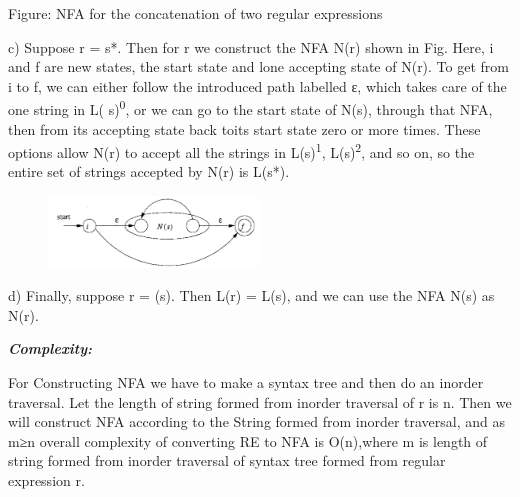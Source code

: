 \documentclass{article}
\begin{document}
\begin{enbref}
\begin{answer}
\begin{center}
\end{center}
\item Figure: NFA for the concatenation of two regular expressions
\item c) Suppose r = s*. Then for r we construct the NFA N(r) shown in Fig.
Here, i and f are new states, the start state and lone accepting state of N(r). To get from i to f,
we can either follow the introduced path labelled ε, which takes care of the one string in L( s)\textsuperscript{0},
or we can go to the start state of N(s), through that NFA, then from its accepting state back toits start state zero or more times. These options allow N(r) to accept all the strings in L(s)\textsuperscript{1},
L(s)\textsuperscript{2}, and so on, so the entire set of strings accepted by N(r) is L(s*).
\begin{figure}
    \centering
    \includegraphics[width=0.5\textwidth]{8.png}
\end{figure} 
\item d) Finally, suppose r = (s). Then L(r) = L(s), and we can use the NFA N(s) as N(r).\\
\item \textit{\textbf{Complexity:}}
\item For Constructing NFA we have to make a syntax tree and then do an inorder traversal. Let the
length of string formed from inorder traversal of r is n. Then we will construct NFA according
to the String formed from inorder traversal, and as m≥n overall complexity of converting RE
to NFA is O(n),where m is length of string formed from inorder traversal of syntax tree formed
from regular expression r.
\end{answer}
\medskip

\end{enbref}
\end{document}
